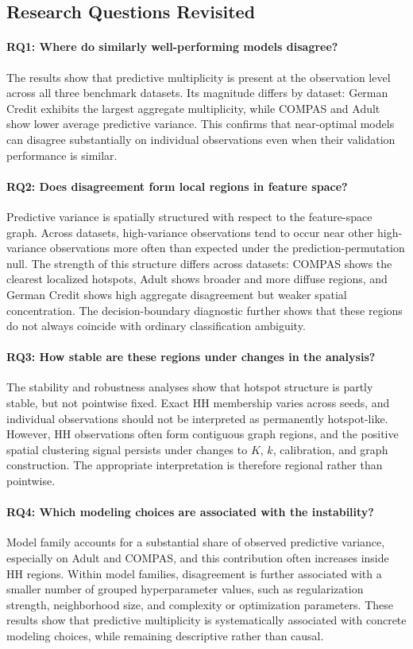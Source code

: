 \subsection{Research Questions Revisited}

\paragraph{RQ1: Where do similarly well-performing models disagree?}
The results show that predictive multiplicity is present at the observation level across all
three benchmark datasets. Its magnitude differs by dataset: German Credit exhibits the
largest aggregate multiplicity, while COMPAS and Adult show lower average predictive
variance. This confirms that near-optimal models can disagree substantially on individual
observations even when their validation performance is similar.

\paragraph{RQ2: Does disagreement form local regions in feature space?}
Predictive variance is spatially structured with respect to the feature-space graph. Across
datasets, high-variance observations tend to occur near other high-variance observations
more often than expected under the prediction-permutation null. The strength of this
structure differs across datasets: COMPAS shows the clearest localized hotspots, Adult
shows broader and more diffuse regions, and German Credit shows high aggregate
disagreement but weaker spatial concentration. The decision-boundary diagnostic further
shows that these regions do not always coincide with ordinary classification ambiguity.

\paragraph{RQ3: How stable are these regions under changes in the analysis?}
The stability and robustness analyses show that hotspot structure is partly stable, but not
pointwise fixed. Exact HH membership varies across seeds, and individual observations
should not be interpreted as permanently hotspot-like. However, HH observations often
form contiguous graph regions, and the positive spatial clustering signal persists under
changes to \(K\), \(k\), calibration, and graph construction. The appropriate interpretation
is therefore regional rather than pointwise.

\paragraph{RQ4: Which modeling choices are associated with the instability?}
Model family accounts for a substantial share of observed predictive variance, especially
on Adult and COMPAS, and this contribution often increases inside HH regions. Within
model families, disagreement is further associated with a smaller number of grouped
hyperparameter values, such as regularization strength, neighborhood size, and complexity
or optimization parameters. These results show that predictive multiplicity is systematically
associated with concrete modeling choices, while remaining descriptive rather than causal.

